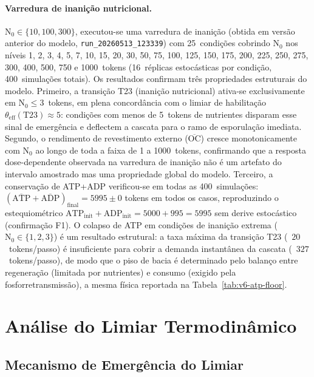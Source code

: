 \paragraph{Varredura de inanição nutricional.}
\label{par:starvation-sweep}
$\text{N}_0 \in \{10, 100, 300\}$, executou-se uma varredura de inanição
(obtida em versão anterior do modelo, \texttt{run\_20260513\_123339}) com 25~condições cobrindo $\text{N}_0$
nos níveis 1, 2, 3, 4, 5, 7, 10, 15, 20, 30, 50, 75, 100, 125, 150,
175, 200, 225, 250, 275, 300, 400, 500, 750 e 1000~tokens
(16~réplicas estocásticas por condição, 400~simulações totais).
Os resultados confirmam três propriedades estruturais do modelo.
Primeiro, a transição T23 (inanição nutricional) ativa-se exclusivamente em
$\text{N}_0 \leq 3$~tokens, em plena concordância com o limiar de habilitação
$\theta_{\text{eff}}(\text{T23}) \approx 5$: condições com menos de
5~tokens de nutrientes disparam esse sinal de emergência e deflectem
a cascata para o ramo de esporulação imediata.
Segundo, o rendimento de revestimento externo ($\overline{\text{OC}}$)
cresce monotonicamente com $\text{N}_0$ ao longo de toda a faixa
de 1 a 1000~tokens, confirmando que a resposta dose-dependente observada
na varredura de inanição não é um artefato do intervalo amostrado
mas uma propriedade global do modelo.
Terceiro, a conservação de ATP+ADP verificou-se em todas as 400~simulações:
$(\overline{\text{ATP}} + \overline{\text{ADP}})_{\text{final}} =
5995 \pm 0$ tokens em todos os casos, reproduzindo o estequiométrico
$\text{ATP}_{\text{init}} + \text{ADP}_{\text{init}} = 5000 + 995 = 5995$
sem derive estocástico (confirmação F1).
O colapso de ATP em condições de inanição extrema
($\text{N}_0 \in \{1, 2, 3\}$) é um resultado estrutural: a taxa máxima
da transição T23 (~$20$~tokens/passo) é insuficiente para cobrir a demanda
instantânea da cascata (~$327$~tokens/passo), de modo que o piso de
bacia é determinado pelo balanço entre regeneração (limitada por nutrientes)
e consumo (exigido pela fosforretransmissão), a mesma física reportada na
Tabela~\ref{tab:v6-atp-floor}.

\section{Análise do Limiar Termodinâmico}
\label{sec:analise-limiar}

\subsection{Mecanismo de Emergência do Limiar}

